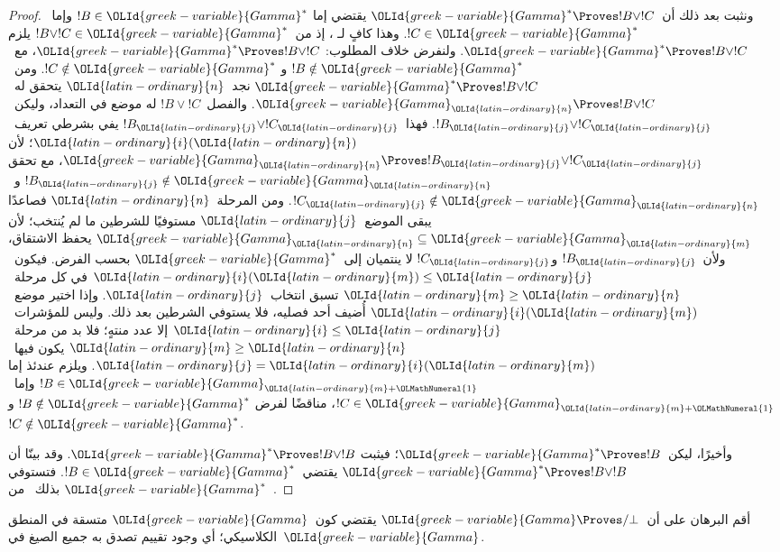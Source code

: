\documentclass[../../../include/open-logic-section]{subfiles}
\begin{document}
\begin{proof}
  ونثبت بعد ذلك أن~$\OLId{greek-variable}{Gamma}^*\Proves !B\lor !C$ يقتضي إما
  $!B\in\OLId{greek-variable}{Gamma}^*$ وإما~$!C\in\OLId{greek-variable}{Gamma}^*$. وهذا كافٍ لـ
  ، إذ من~$!B\lor !C\in\OLId{greek-variable}{Gamma}^*$ يلزم
  $\OLId{greek-variable}{Gamma}^*\Proves !B\lor !C$. ولنفرض خلاف المطلوب:
  $\OLId{greek-variable}{Gamma}^*\Proves !B\lor !C$، مع~$!B\notin\OLId{greek-variable}{Gamma}^*$ و
  $!C\notin\OLId{greek-variable}{Gamma}^*$. ومن~$\OLId{greek-variable}{Gamma}^*\Proves !B\lor !C$ نجد~$\OLId{latin-ordinary}{n}$
  يتحقق له~$\OLId{greek-variable}{Gamma}_\OLId{latin-ordinary}{n}\Proves !B\lor !C$. والفصل~$!B\lor !C$ له موضع
  في التعداد، وليكن~$!B_\OLId{latin-ordinary}{j}\lor !C_\OLId{latin-ordinary}{j}$. فهذا~$!B_\OLId{latin-ordinary}{j}\lor !C_\OLId{latin-ordinary}{j}$ يفي بشرطي
  تعريف~$\OLId{latin-ordinary}{i}(\OLId{latin-ordinary}{n})$؛ لأن
  $\OLId{greek-variable}{Gamma}_\OLId{latin-ordinary}{n}\Proves !B_\OLId{latin-ordinary}{j}\lor !C_\OLId{latin-ordinary}{j}$، مع تحقق
  $!B_\OLId{latin-ordinary}{j}\notin\OLId{greek-variable}{Gamma}_\OLId{latin-ordinary}{n}$ و~$!C_\OLId{latin-ordinary}{j}\notin\OLId{greek-variable}{Gamma}_\OLId{latin-ordinary}{n}$. ومن المرحلة~$\OLId{latin-ordinary}{n}$
  فصاعدًا يبقى الموضع~$\OLId{latin-ordinary}{j}$ مستوفيًا للشرطين ما لم يُنتخب؛ لأن
  $\OLId{greek-variable}{Gamma}_\OLId{latin-ordinary}{n}\subseteq\OLId{greek-variable}{Gamma}_\OLId{latin-ordinary}{m}$ يحفظ الاشتقاق، ولأن~$!B_\OLId{latin-ordinary}{j}$ و$!C_\OLId{latin-ordinary}{j}$ لا
  ينتميان إلى~$\OLId{greek-variable}{Gamma}^*$ بحسب الفرض. فيكون~$\OLId{latin-ordinary}{i}(\OLId{latin-ordinary}{m})\leq \OLId{latin-ordinary}{j}$ في كل
  مرحلة~$\OLId{latin-ordinary}{m}\geq \OLId{latin-ordinary}{n}$ تسبق انتخاب~$\OLId{latin-ordinary}{j}$. وإذا اختير موضع~$\OLId{latin-ordinary}{i}(\OLId{latin-ordinary}{m})$ أُضيف أحد فصليه، فلا
  يستوفي الشرطين بعد ذلك. وليس للمؤشرات~$\OLId{latin-ordinary}{i}\leq \OLId{latin-ordinary}{j}$ إلا عدد منتهٍ؛ فلا بد
  من مرحلة~$\OLId{latin-ordinary}{m}\geq \OLId{latin-ordinary}{n}$ يكون فيها~$\OLId{latin-ordinary}{j}=\OLId{latin-ordinary}{i}(\OLId{latin-ordinary}{m})$. ويلزم عندئذ إما
  $!B\in\OLId{greek-variable}{Gamma}_{\OLId{latin-ordinary}{m}+\OLMathNumeral{1}}$ وإما~$!C\in\OLId{greek-variable}{Gamma}_{\OLId{latin-ordinary}{m}+\OLMathNumeral{1}}$، مناقضًا لفرض
  $!B\notin\OLId{greek-variable}{Gamma}^*$ و$!C\notin\OLId{greek-variable}{Gamma}^*$.

  وأخيرًا، ليكن~$\OLId{greek-variable}{Gamma}^*\Proves !B$؛ فيثبت
  $\OLId{greek-variable}{Gamma}^*\Proves !B\lor !B$. وقد بينّا أن
  $\OLId{greek-variable}{Gamma}^*\Proves !B\lor !B$ يقتضي~$!B\in\OLId{greek-variable}{Gamma}^*$. فتستوفي
  $\OLId{greek-variable}{Gamma}^*$ بذلك~ من~.
\end{proof}

\begin{prob}
أقم البرهان على أن~$\OLId{greek-variable}{Gamma} \Proves/ \bot$ يقتضي كون~$\OLId{greek-variable}{Gamma}$ متسقة في
المنطق الكلاسيكي؛ أي وجود تقييم تصدق به جميع الصيغ في~$\OLId{greek-variable}{Gamma}$.
\end{prob}
\end{document}
